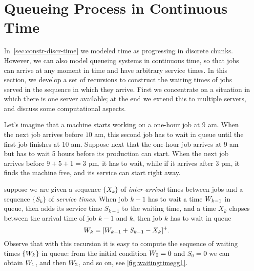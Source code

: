 



\section{Queueing Process in Continuous Time}
\label{sec:constr-gg1-queu}

In~\cref{sec:constr-discr-time} we modeled time as progressing in discrete chunks.
However, we can also model queueing systems in continuous time, so that jobs can arrive at any moment in time and have arbitrary service times.
In this section, we develop a set of recursions to construct the waiting times of jobs served in the sequence in which they arrive.
First we concentrate on a situation in which there is one server available; at the end we extend this to multiple servers, and discuss some computational aspects.


Let's imagine that a machine starts working on a one-hour job at 9 am.
When the next job arrives before $10$ am, this second job has to wait in queue until the first job finishes at 10 am.
Suppose next that the one-hour job arrives at 9 am but has to wait 5 hours before its production can start.
When the next job arrives before $9+5+1= 3$ pm, it has to wait, while if it arrives after 3 pm, it finds the machine free, and its service can start right away.

 suppose we are given a sequence $\{X_k\}$ of \emph{inter-arrival} times between jobs and a sequence $\{S_k\}$ of \emph{service times}.
When job $k-1$ has to wait a time $W_{k-1}$ in queue, then adds its service time $S_{k-1}$ to the waiting time, and a time $X_k$ elapses between the arrival time of job $k-1$ and $k$, then job $k$ has to wait in queue
\begin{equation}\label{eq:56}
 W_{k} = [W_{k-1} + S_{k-1}-X_k]^+.
\end{equation}
Observe
that with this recursion it is easy to compute the sequence of waiting times $\{W_k\}$ in queue: from the initial condition $W_{0}=0$ and $S_0=0$ we can obtain $W_{1}$, and then $W_{2}$, and so on, see \cref{fig:waitingtimegg1}.



